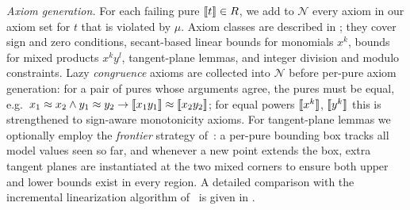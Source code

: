 \emph{Axiom generation.}
For each failing pure $\llbracket t \rrbracket \in R$, we add to $\mathcal{N}$ every
axiom in our axiom set for $t$ that is violated by $\mu$.
Axiom classes are described in ; they cover sign and zero
conditions, secant-based linear bounds for monomials $x^k$, bounds for mixed
products $x^k y^l$, tangent-plane lemmas, and integer division and modulo
constraints.
Lazy \emph{congruence} axioms are collected into $\mathcal{N}$ before
per-pure axiom generation: for a pair of pures whose arguments agree, the
pures must be equal, e.g.\ $x_1 \approx x_2 \wedge y_1 \approx y_2
	\rightarrow \llbracket x_1 y_1 \rrbracket \approx \llbracket x_2 y_2 \rrbracket$; for equal powers
$\llbracket x^k \rrbracket$, $\llbracket y^k \rrbracket$ this is strengthened to sign-aware monotonicity
axioms.
For tangent-plane lemmas we optionally employ the \emph{frontier} strategy
of~\cite{cimatti2017tacas}: a per-pure bounding box tracks all model values
seen so far, and whenever a new point extends the box, extra tangent planes
are instantiated at the two mixed corners to ensure both upper and lower
bounds exist in every region.
A detailed comparison with the incremental linearization algorithm
of~\cite{cimatti2018sat} is given in .
